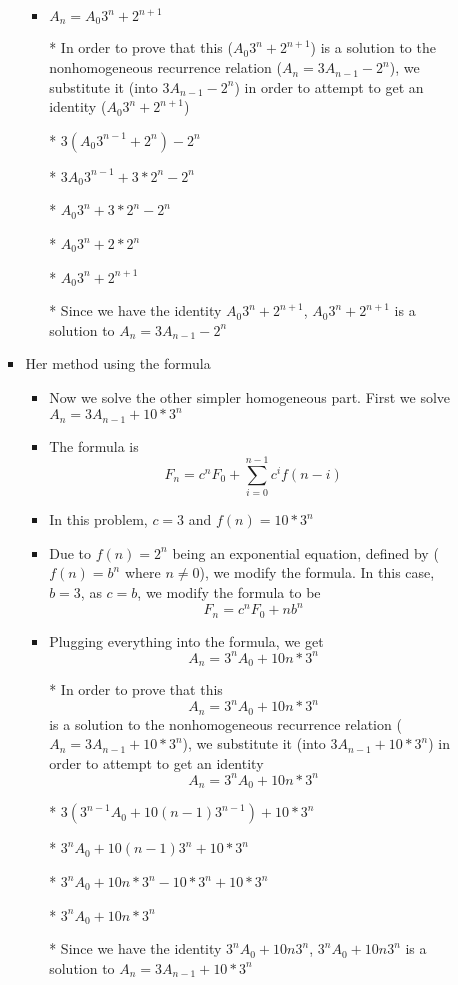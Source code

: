 \documentclass{article}
\begin{document}
\begin{enumerate}
\begin{enumerate}
\begin{itemize}
\begin{itemize}
      \item $A_{n}=A_{0}3^{n}+2^{n+1}$
      \item [*] In order to prove that this ($A_{0}3^{n}+2^{n+1}$) is a solution to the nonhomogeneous recurrence relation ($A_{n}=3A_{n-1}-2^{n}$), we substitute it (into $3A_{n-1}-2^{n}$) in order to attempt to get an identity ($A_{0}3^{n}+2^{n+1}$)
      \item [*] $3(A_{0}3^{n-1}+2^{n})-2^{n}$
      \item [*] $3A_{0}3^{n-1}+3*2^{n}-2^{n}$
      \item [*] $A_{0}3^{n}+3*2^{n}-2^{n}$
      \item [*] $A_{0}3^{n}+2*2^{n}$
      \item [*] $A_{0}3^{n}+2^{n+1}$
      \item [*] Since we have the identity $A_{0}3^{n}+2^{n+1}$, $A_{0}3^{n}+2^{n+1}$ is a solution to $A_{n}=3A_{n-1}-2^{n}$
      \end{itemize} %
    \item Her method using the formula
      \begin{itemize} %
      \item Now we solve the other simpler homogeneous part. First we solve $A_{n}=3A_{n-1}+10*3^{n}$
      \item The formula is $$F_{n}=c^{n}F_{0} + \sum\limits_{i=0}^{n-1}c^{i}f(n-i)$$
      \item In this problem, $c=3$ and $f(n)=10*3^{n}$
      \item Due to $f(n)=2^{n}$ being an exponential equation, defined by ($f(n)=b^{n}$ where $n\neq0$), we modify the formula. In this case, $b=3$, as $c=b$, we modify the formula to be $$F_{n}=c^{n}F_{0} + nb^{n}$$
      \item Plugging everything into the formula, we get $$A_{n}=3^{n}A_{0}+10n*3^{n}$$
      \item [*] In order to prove that this $$A_{n}=3^{n}A_{0}+10n*3^{n}$$ is a solution to the nonhomogeneous recurrence relation ($A_{n}=3A_{n-1}+10*3^{n}$), we substitute it (into $3A_{n-1}+10*3^{n}$) in order to attempt to get an identity $$A_{n}=3^{n}A_{0}+10n*3^{n}$$
      \item [*] $3(3^{n-1}A_{0}+10(n-1)3^{n-1})+10*3^{n}$
      \item [*] $3^{n}A_{0}+10(n-1)3^{n}+10*3^{n}$
      \item [*] $3^{n}A_{0}+10n*3^{n}-10*3^{n}+10*3^{n}$
      \item [*] $3^{n}A_{0}+10n*3^{n}$
      \item [*] Since we have the identity $3^{n}A_{0}+10n3^{n}$, $3^{n}A_{0}+10n3^{n}$ is a solution to $A_{n}=3A_{n-1}+10*3^{n}$

\end{itemize}
\end{itemize}
\end{enumerate}
\end{enumerate}
\end{document}
